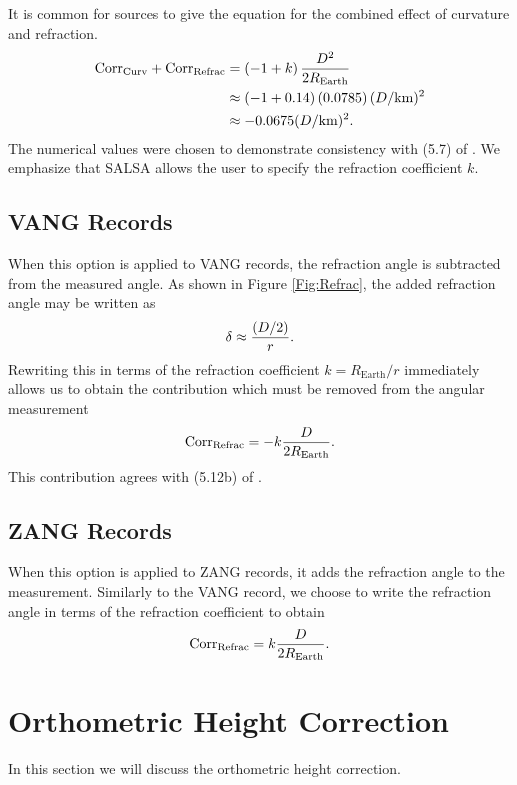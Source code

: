 It is common for sources to give the equation for the combined effect of curvature and refraction.  
\begin{equation}
\begin{split}
\text{Corr}_{\text{Curv}}+\text{Corr}_{\text{Refrac}}&=\left(-1+k\right)\frac{D^2}{2R_{\text{Earth}}}\\
&\approx \left(-1+0.14\right)\left(0.0785\right)(D/\text{km})^2\\
&\approx -0.0675 (D/\text{km})^2.
\end{split}
\end{equation}
The numerical values were chosen to demonstrate consistency with (5.7) of \cite{anderson}.  We emphasize that SALSA allows the user to specify the refraction coefficient $k$.

\subsection{VANG Records}
When this option is applied to VANG records, the refraction angle is subtracted from the measured angle.  As shown in Figure \ref{Fig:Refrac}, the added refraction angle may be written as
\begin{equation}
\delta \approx \frac{(D/2)}{r}.
\end{equation}
Rewriting this in terms of the refraction coefficient $k=R_{\text{Earth}}/r$ immediately allows us to obtain the contribution which must be removed from the angular measurement
\begin{equation}
\text{Corr}_{\text{Refrac}}=-k\frac{D}{2R_{\text{Earth}}}.
\end{equation}
This contribution agrees with (5.12b) of \cite{torge}.
\subsection{ZANG Records}
When this option is applied to ZANG records, it adds the refraction angle to the measurement.  Similarly to the VANG record, we choose to write the refraction angle in terms of the refraction coefficient to obtain
\begin{equation}
\text{Corr}_{\text{Refrac}}=k\frac{D}{2R_{\text{Earth}}}.
\end{equation}

\section{Orthometric Height Correction}\label{sec:OHC}
In this section we will discuss the orthometric height correction.
